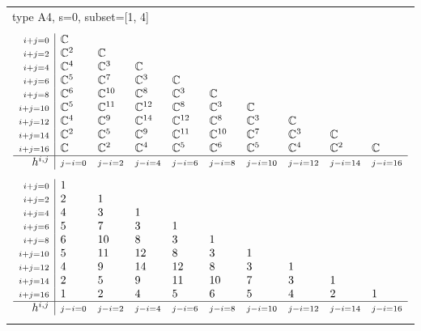 \documentclass[crop,border=2mm]{standalone}
\begin{document}
\begin{tabular}{l}
{\huge type A4, s=0, subset=[1, 4]}\\ \\


$\displaystyle
\begin{array}{r|l l l l l l l l l}
	{\scriptstyle i+j=0}&\mathbb{C}&&&&&&&&\\
	{\scriptstyle i+j=2}&\mathbb{C}^{2}&\mathbb{C}&&&&&&&\\
	{\scriptstyle i+j=4}&\mathbb{C}^{4}&\mathbb{C}^{3}&\mathbb{C}&&&&&&\\
	{\scriptstyle i+j=6}&\mathbb{C}^{5}&\mathbb{C}^{7}&\mathbb{C}^{3}&\mathbb{C}&&&&&\\
	{\scriptstyle i+j=8}&\mathbb{C}^{6}&\mathbb{C}^{10}&\mathbb{C}^{8}&\mathbb{C}^{3}&\mathbb{C}&&&&\\
	{\scriptstyle i+j=10}&\mathbb{C}^{5}&\mathbb{C}^{11}&\mathbb{C}^{12}&\mathbb{C}^{8}&\mathbb{C}^{3}&\mathbb{C}&&&\\
	{\scriptstyle i+j=12}&\mathbb{C}^{4}&\mathbb{C}^{9}&\mathbb{C}^{14}&\mathbb{C}^{12}&\mathbb{C}^{8}&\mathbb{C}^{3}&\mathbb{C}&&\\
	{\scriptstyle i+j=14}&\mathbb{C}^{2}&\mathbb{C}^{5}&\mathbb{C}^{9}&\mathbb{C}^{11}&\mathbb{C}^{10}&\mathbb{C}^{7}&\mathbb{C}^{3}&\mathbb{C}&\\
	{\scriptstyle i+j=16}&\mathbb{C}&\mathbb{C}^{2}&\mathbb{C}^{4}&\mathbb{C}^{5}&\mathbb{C}^{6}&\mathbb{C}^{5}&\mathbb{C}^{4}&\mathbb{C}^{2}&\mathbb{C}\\
	\hline h^{i,j}&{\scriptstyle j-i=0}&{\scriptstyle j-i=2}&{\scriptstyle j-i=4}&{\scriptstyle j-i=6}&{\scriptstyle j-i=8}&{\scriptstyle j-i=10}&{\scriptstyle j-i=12}&{\scriptstyle j-i=14}&{\scriptstyle j-i=16}
\end{array}
$ \\ \\


$\displaystyle
\begin{array}{r|l l l l l l l l l}
	{\scriptstyle i+j=0}&1&&&&&&&&\\
	{\scriptstyle i+j=2}&2&1&&&&&&&\\
	{\scriptstyle i+j=4}&4&3&1&&&&&&\\
	{\scriptstyle i+j=6}&5&7&3&1&&&&&\\
	{\scriptstyle i+j=8}&6&10&8&3&1&&&&\\
	{\scriptstyle i+j=10}&5&11&12&8&3&1&&&\\
	{\scriptstyle i+j=12}&4&9&14&12&8&3&1&&\\
	{\scriptstyle i+j=14}&2&5&9&11&10&7&3&1&\\
	{\scriptstyle i+j=16}&1&2&4&5&6&5&4&2&1\\
	\hline h^{i,j}&{\scriptstyle j-i=0}&{\scriptstyle j-i=2}&{\scriptstyle j-i=4}&{\scriptstyle j-i=6}&{\scriptstyle j-i=8}&{\scriptstyle j-i=10}&{\scriptstyle j-i=12}&{\scriptstyle j-i=14}&{\scriptstyle j-i=16}
\end{array}
$ \\ \\



\end{tabular}
\end{document}
